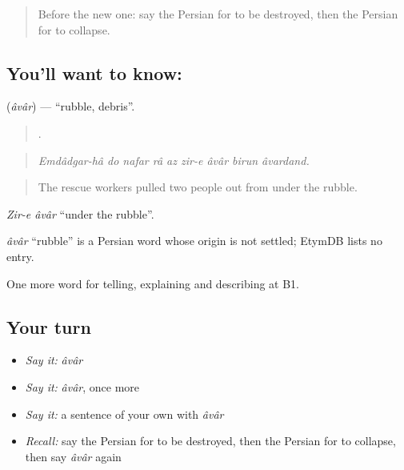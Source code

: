 \label{lesson:FA-C331-avar}



\begin{quote}
Before the new one: say the Persian for to be destroyed, then the Persian for to collapse.
\end{quote}

\subsection*{You'll want to know: }
\textbf{} (\emph{âvâr}) — \textquotedblleft{}rubble, debris\textquotedblright{}.

\begin{quote}
        .
\end{quote}

\begin{quote}
\emph{Emdâdgar-hâ do nafar râ az zir-e âvâr birun âvardand.}
\end{quote}

\begin{quote}
The rescue workers pulled two people out from under the rubble.
\end{quote}

\emph{Zir-e âvâr} \textquotedblleft{}under the rubble\textquotedblright{}.

\begin{cousinweb}
\emph{âvâr} \textquotedblleft{}rubble\textquotedblright{} is a Persian word whose origin is not settled; EtymDB lists no entry.
\end{cousinweb}

\begin{grammarlens}[title={What you've built}]
One more word for telling, explaining and describing at B1.
\end{grammarlens}

\subsection*{Your turn}
\begin{itemize}
\raggedright
  \item \emph{Say it:} \emph{âvâr}
  \item \emph{Say it:} \emph{âvâr}, once more
  \item \emph{Say it:} a sentence of your own with \emph{âvâr}
  \item \emph{Recall:} say the Persian for to be destroyed, then the Persian for to collapse, then say \emph{âvâr} again
\end{itemize}

